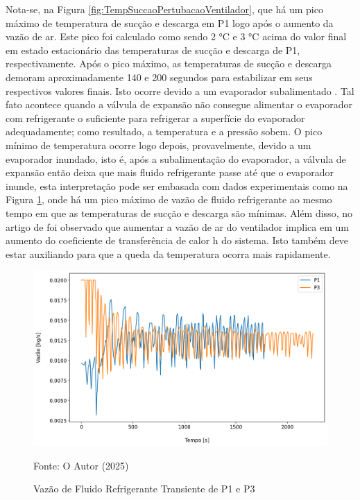 Nota-se, na Figura \ref{fig:TempSuccaoPertubacaoVentilador}, que há um pico máximo de temperatura de sucção e descarga em P1 logo após o aumento da vazão de ar. Este pico foi calculado como sendo 2 °C e 3 °C acima do valor final em estado estacionário das temperaturas de sucção e descarga de P1, respectivamente. Após o pico máximo, as temperaturas de sucção e descarga demoram aproximadamente 140 e 200 segundos para estabilizar em seus respectivos valores finais. Isto ocorre devido a um evaporador subalimentado \cite{StoekerRefrigeration}. Tal fato acontece quando a válvula de expansão não consegue alimentar o evaporador com refrigerante o suficiente para refrigerar a superfície do evaporador adequadamente; como resultado, a temperatura e a pressão sobem.
\newpage
O pico mínimo de temperatura ocorre logo depois, provavelmente, devido a um evaporador inundado, isto é, após a subalimentação do evaporador, a válvula de expansão então deixa que mais fluido refrigerante passe até que o evaporador inunde, esta interpretação pode ser embasada com dados experimentais como na Figura \ref{fig:VazãodeFluidoPerturbaçãoVentilador}, onde há um pico máximo de vazão de fluido refrigerante ao mesmo tempo em que as temperaturas de sucção e descarga são mínimas. Além disso, no artigo de \textcite{VaryingFanSpeedCavallaro} foi observado que aumentar a vazão de ar do ventilador implica em um aumento do coeficiente de transferência de calor h do sistema. Isto também deve estar auxiliando para que a queda da temperatura ocorra mais rapidamente.

\begin{figure}[h]
    \centering
    \includegraphics[width=1\linewidth]{FigurasdoTexto/VazãodeFluidoPerturbaçãoVentilador.png}
    \caption{Vazão de Fluido Refrigerante Transiente de P1 e P3}
    \label{fig:VazãodeFluidoPerturbaçãoVentilador}
    {\footnotesize Fonte: O Autor (2025)}
\end{figure}

